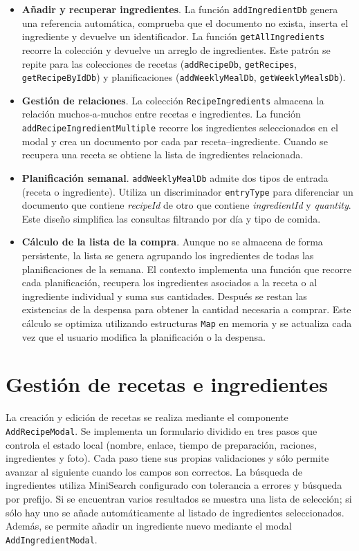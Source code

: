 \documentclass[twoside, openright, 11pt]{report}
\begin{document}
\begin{itemize}
  \item \textbf{Añadir y recuperar ingredientes}. La función \texttt{addIngredientDb} genera una referencia automática, comprueba que el documento no exista, inserta el ingrediente y devuelve un identificador. La función \texttt{getAllIngredients} recorre la colección y devuelve un arreglo de ingredientes. Este patrón se repite para las colecciones de recetas (\texttt{addRecipeDb}, \texttt{getRecipes}, \texttt{getRecipeByIdDb}) y planificaciones (\texttt{addWeeklyMealDb}, \texttt{getWeeklyMealsDb}).
  \item \textbf{Gestión de relaciones}. La colección \texttt{RecipeIngredients} almacena la relación muchos‑a‑muchos entre recetas e ingredientes. La función \texttt{addRecipeIngredientMultiple} recorre los ingredientes seleccionados en el modal y crea un documento por cada par receta–ingrediente. Cuando se recupera una receta se obtiene la lista de ingredientes relacionada.
  \item \textbf{Planificación semanal}. \texttt{addWeeklyMealDb} admite dos tipos de entrada (receta o ingrediente). Utiliza un discriminador \texttt{entryType} para diferenciar un documento que contiene \emph{recipeId} de otro que contiene \emph{ingredientId} y \emph{quantity}. Este diseño simplifica las consultas filtrando por día y tipo de comida.
  \item \textbf{Cálculo de la lista de la compra}. Aunque no se almacena de forma persistente, la lista se genera agrupando los ingredientes de todas las planificaciones de la semana. El contexto implementa una función que recorre cada planificación, recupera los ingredientes asociados a la receta o al ingrediente individual y suma sus cantidades. Después se restan las existencias de la despensa para obtener la cantidad necesaria a comprar. Este cálculo se optimiza utilizando estructuras \texttt{Map} en memoria y se actualiza cada vez que el usuario modifica la planificación o la despensa.
\end{itemize}

\section{Gestión de recetas e ingredientes}
La creación y edición de recetas se realiza mediante el componente \texttt{AddRecipeModal}. Se implementa un formulario dividido en tres pasos que controla el estado local (nombre, enlace, tiempo de preparación, raciones, ingredientes y foto). Cada paso tiene sus propias validaciones y sólo permite avanzar al siguiente cuando los campos son correctos. La búsqueda de ingredientes utiliza MiniSearch configurado con tolerancia a errores y búsqueda por prefijo. Si se encuentran varios resultados se muestra una lista de selección; si sólo hay uno se añade automáticamente al listado de ingredientes seleccionados. Además, se permite añadir un ingrediente nuevo mediante el modal \texttt{AddIngredientModal}.
\end{document}
